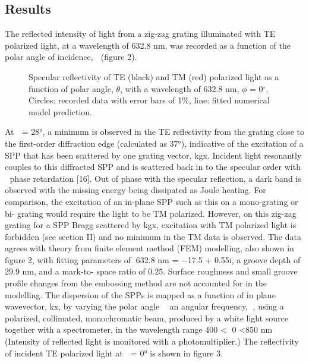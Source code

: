 \documentclass[oneside,11pt,book]{book}
\begin{document}
\subsection{Results}
The reflected intensity of light from a zig-zag grating illuminated with TE polarized light, at a wavelength of 632.8 nm, was recorded as a function of the polar angle of incidence,  (figure 2). 
\begin{figure}
\begin{center}

\caption{Specular reflectivity of TE (black) and TM (\color{red}red\color{black}) polarized light as a function of polar angle, $\theta$, with a wavelength of 632.8 nm, $\phi$ = 0$^\circ$. Circles: recorded data with error bars of 1\%, line: fitted numerical model prediction.}
\end{center}
\end{figure}
At  = 28°, a minimum is observed in the TE reflectivity from the grating close to the first-order diffraction edge (calculated as 37°), indicative of the excitation of a SPP that has been scattered by one grating vector, kgx. Incident light resonantly couples to this diffracted SPP and is scattered back in to the specular order with  phase retardation [16]. Out of phase with the specular reflection, a dark band is observed with the missing energy being dissipated as Joule heating. For comparison, the excitation of an in-plane SPP such as this on a mono-grating or bi- grating would require the light to be TM polarized. However, on this zig-zag grating for a SPP Bragg scattered by kgx, excitation with TM polarized light is forbidden (see section II) and no minimum in the TM data is observed. The data agrees with theory from finite element method (FEM) modelling, also shown in figure 2, with fitting
parameters of 632.8 nm = −17.5 + 0.55i, a groove depth of 29.9 nm, and a mark-to- space ratio of 0.25. Surface roughness and small groove profile changes from the embossing method are not accounted for in the modelling.
The dispersion of the SPPs is mapped as a function of in plane wavevector, kx, by varying the polar angle  an angular frequency, , using a polarized, collimated, monochromatic beam, produced by a white light source together with a spectrometer, in the wavelength range 400 < 0 <850 nm (Intensity of reflected light is monitored with a photomultiplier.)
The reflectivity of incident TE polarized light at  = 0° is shown in figure 3. 
\end{document}
